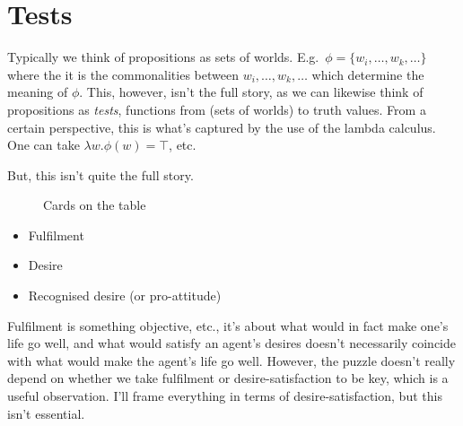 \documentclass[10pt]{article}
\begin{document}
\section{Tests}
\label{sec:tests}

Typically we think of propositions as sets of worlds.
E.g.\ \(\phi = \{w_{i}, \dots, w_{k}, \dots\}\) where the it is the commonalities between \(w_{i}, \dots, w_{k}, \dots\) which determine the meaning of \(\phi\).
This, however, isn't the full story, as we can likewise think of propositions as \emph{tests}, functions from (sets of worlds) to truth values.
From a certain perspective, this is what's captured by the use of the lambda calculus.
One can take \(\lambda w.\phi(w) = \top\), etc.\

But, this isn't quite the full story.


\begin{figure}[h]
  \centering
  \caption{Cards on the table}
  \label{fig:cards}
\end{figure}

\newpage

\begin{itemize}
\item Fulfilment
\item Desire
\item Recognised desire (or pro-attitude)
\end{itemize}

Fulfilment is something objective, etc., it's about what would in fact make one's life go well, and what would satisfy an agent's desires doesn't necessarily coincide with what would make the agent's life go well.
However, the puzzle doesn't really depend on whether we take fulfilment or desire-satisfaction to be key, which is a useful observation.
I'll frame everything in terms of desire-satisfaction, but this isn't essential.
\end{document}
